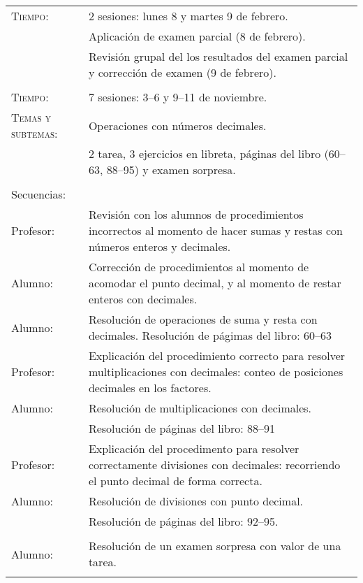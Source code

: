 \documentclass[letterpaper,10pt]{article}
\begin{document}
\begin{tabular}[t]{R{0.25\textwidth}p{0.71\textwidth}}
    \textsc{Tiempo:}& 2 sesiones: lunes 8 y martes 9  de febrero. \\
            & {\Large \sc Aplicaci\'on de examen parcial} (8 de febrero). \\           
            & Revisi\'on grupal del los resultados del examen parcial y
            correcci\'on de examen (9 de febrero).\\
\\ \hline

    \textsc{Tiempo:}                    & 7 sesiones: 3--6 y 9--11  de noviembre. \\
    \textsc{Temas y subtemas:}          & Operaciones con n\'umeros decimales.\\
              & 2 tarea, 3 ejercicios en libreta, p\'aginas del libro (60--63, 88--95) y examen sorpresa. \\ \\
    \large{\sc Secuencias:} \\
    Profesor:    & Revisi\'on con los alumnos de procedimientos incorrectos al momento de hacer sumas y restas con n\'umeros enteros y decimales. \\
    Alumno:     & Correcci\'on de procedimientos al momento de acomodar el punto decimal, y al momento de restar enteros con decimales.\\
    Alumno:     & Resoluci\'on de operaciones de suma y resta con decimales. Resolución de p\'agimas del libro: 60--63 \\
    Profesor:   & Explicaci\'on del procedimiento correcto para resolver multiplicaciones con decimales: conteo de posiciones decimales en los factores. \\

    Alumno:     & Resoluci\'on de multiplicaciones con decimales. \\
                & Resoluci\'on de p\'aginas del libro: 88--91 \\
    Profesor:   & Explicaci\'on del procedimento para resolver correctamente divisiones con decimales: recorriendo el punto decimal de forma correcta. \\
    Alumno:     & Resoluci\'on de divisiones con punto decimal. \\ 
                & Resoluci\'on de p\'aginas del libro: 92--95. \\ \\
    Alumno:     & Resoluci\'on de un examen sorpresa con valor de una tarea.
\\ \hline \\
\end{tabular}
\end{document}
